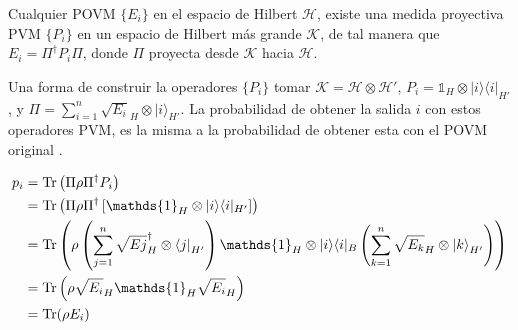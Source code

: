 \begin{theorem} Cualquier POVM $\{E_i\}$ en el espacio de Hilbert $\mathcal{H}$, existe una medida proyectiva PVM $\{P_i\}$ en un espacio de Hilbert más grande $\mathcal{K}$, de tal manera que $E_i=\Pi^\dagger P_i\Pi$, donde $\Pi$ proyecta desde $\mathcal{K}$ hacia $\mathcal{H}$.
\end{theorem}
	

Una forma de construir la operadores $\{P_i\}$ tomar  $\mathcal{K}=\mathcal{H}\otimes\mathcal{H'}$, $P _{i}=\mathds{1} _{H}\otimes |i\rangle \langle i|_{H'}$, y
$\Pi=\sum _{i=1}^{n}{\sqrt {E_{i}}}_{H}\otimes {|i\rangle }_{H'}$. La probabilidad de obtener la salida $i$ con estos operadores PVM, es la misma a la probabilidad de obtener esta con el POVM original {\cite{2007geometry}}.


\begin{equation}
 \begin{split}
 p_i&=\tr \left(\Pi\rho\Pi^{\dagger }P _{i}\right)\\
 &=\tr \left(\Pi\rho \Pi^{\dagger }\left[\mathds{1}_{H}\otimes |i\rangle \langle i|_{H'}\right]\right)\\
 &=\tr \left(\rho\left(\sum _{j=1}^{n}{\sqrt {E{j}}}_{H}^{\dagger }\otimes {\langle j|}_{H'}\right)\mathds{1} _{H}\otimes |i\rangle \langle i|_{B}\left(\sum _{k=1}^{n}{\sqrt {E_{k}}}_{H}\otimes {|k\rangle }_{H'}\right)\right)\\
 &=\tr \left(\rho {\sqrt {E_{i}}}_{H}\mathds{1} _{H}{\sqrt {E_{i}}}_{H}\right)\\
 &=\tr (\rho E_{i})
 \end{split}
\end{equation}
































